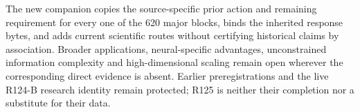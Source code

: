 The new companion copies the source-specific prior action and remaining
requirement for every one of the 620 major blocks, binds the inherited
response bytes, and adds current scientific routes without certifying
historical claims by association. Broader applications, neural-specific
advantages, unconstrained information complexity and high-dimensional
scaling remain open wherever the corresponding direct evidence is absent.
Earlier preregistrations and the live R124-B research identity remain
protected; R125 is neither their completion nor a substitute for their data.
